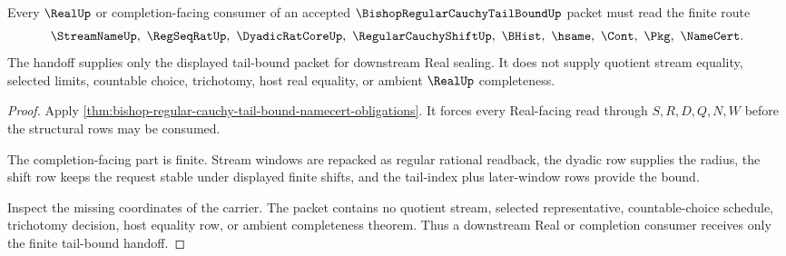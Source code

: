 \begin{theorem}
\label{thm:bishop-regular-cauchy-tail-bound-real-handoff}
Every $\RealUp$ or completion-facing consumer of an accepted $\BishopRegularCauchyTailBoundUp$ packet must read the finite route
$$
\StreamNameUp,\ \RegSeqRatUp,\ \DyadicRatCoreUp,\ \RegularCauchyShiftUp,\ \BHist,\ \hsame,\ \Cont,\ \Pkg,\ \NameCert .
$$
The handoff supplies only the displayed tail-bound packet for downstream Real sealing. It does not supply quotient stream equality, selected limits, countable choice, trichotomy, host real equality, or ambient $\RealUp$ completeness.
\end{theorem}
\begin{proof}
Apply \autoref{thm:bishop-regular-cauchy-tail-bound-namecert-obligations}. It forces every Real-facing read through $S,R,D,Q,N,W$ before the structural rows may be consumed.

The completion-facing part is finite. Stream windows are repacked as regular rational readback, the dyadic row supplies the radius, the shift row keeps the request stable under displayed finite shifts, and the tail-index plus later-window rows provide the bound.

Inspect the missing coordinates of the carrier. The packet contains no quotient stream, selected representative, countable-choice schedule, trichotomy decision, host equality row, or ambient completeness theorem. Thus a downstream Real or completion consumer receives only the finite tail-bound handoff.
\end{proof}




